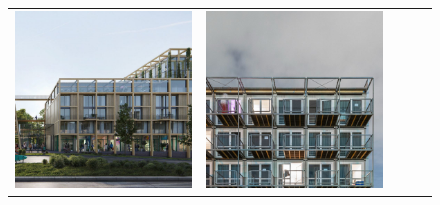\begin{figure}[H]
{\begin{tabular}{@{}ccccc@{}}
      \includegraphics[width=\linewidth]{Images/LoRAs/Modulariteit/Training_images/6.jpg} &
      \includegraphics[width=\linewidth]{Images/LoRAs/Modulariteit/Training_images/7.jpg} &

\end{tabular}}
\end{figure}
